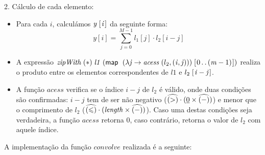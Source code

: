 \documentclass[11pt, a4paper, fleqn]{article}
\newcommand{\Varid}[1]{\mathit{#1}}
\renewcommand{\leq}{\leqslant}
\begin{document}
2. Cálculo de cada elemento:
\begin{itemize}
\item Para cada \ensuremath{\Varid{i}}, calculámos \ensuremath{\Varid{y}\;[\mskip1.5mu \Varid{i}\mskip1.5mu]} da seguinte forma:
\[
y[i] = \sum_{j=0}^{M-1} l_1[j] \cdot l_2[i-j]
\]
\item A expressão \ensuremath{\Varid{zipWith}\;(\mathbin{*})\;\Varid{l1}\;(\map \;(\lambda \Varid{j}\to \Varid{acess}\;(l_2 ,(\Varid{i},\Varid{j})))\;[\mskip1.5mu \mathrm{0}\mathinner{\ldotp\ldotp}(\Varid{m}\mathbin{-}\mathrm{1})\mskip1.5mu])} realiza o produto entre os elementos correspondentes de \ensuremath{\Varid{l1}} e \ensuremath{l_2 \;[\mskip1.5mu \Varid{i}\mathbin{-}\Varid{j}\mskip1.5mu]}.
\item A função \ensuremath{\Varid{acess}} verifica se o índice \ensuremath{\Varid{i}\mathbin{-}\Varid{j}} de \ensuremath{l_2 } é válido, onde duas condições são confirmadas: \ensuremath{\Varid{i}\mathbin{-}\Varid{j}} tem de ser 
não negativo (\ensuremath{\uncurry{(\mathbin{>})}\comp (\underline{\mathrm{0}}\times\uncurry{(\mathbin{-})})}) e menor que o comprimento de \ensuremath{l_2 } (\ensuremath{\uncurry{(\leq )}\comp (\length \times\uncurry{(\mathbin{-})})}).
Caso uma destas condições seja verdadeira, a função \ensuremath{\Varid{acess}} retorna 0, caso contrário, retorna o valor de \ensuremath{l_2 } com aquele índice.
\end{itemize}

A implementação da função \ensuremath{\Varid{convolve}} realizada é a seguinte:
\end{document}
